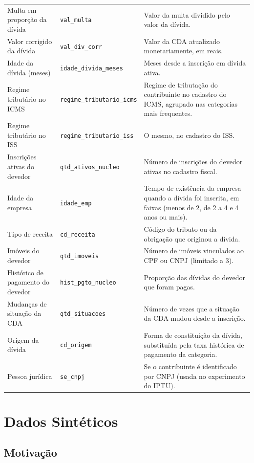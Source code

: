 {\begin{longtable}{>{\small\raggedright\arraybackslash}p{3.7cm}>{\small\raggedright\arraybackslash}p{4.4cm}>{\small\raggedright\arraybackslash}p{\dimexpr\textwidth-8.1cm-6\tabcolsep\relax}}
        Multa em proporção da dívida & \texttt{val\_multa} & Valor da multa dividido pelo valor da dívida. \\
        Valor corrigido da dívida & \texttt{val\_div\_corr} & Valor da CDA atualizado monetariamente, em reais. \\
        Idade da dívida (meses) & \texttt{idade\_divida\_meses} & Meses desde a inscrição em dívida ativa. \\
        Regime tributário no ICMS & \texttt{regime\_tributario\_icms} & Regime de tributação do contribuinte no cadastro do ICMS, agrupado nas categorias mais frequentes. \\
        Regime tributário no ISS & \texttt{regime\_tributario\_iss} & O mesmo, no cadastro do ISS. \\
        Inscrições ativas do devedor & \texttt{qtd\_ativos\_nucleo} & Número de inscrições do devedor ativas no cadastro fiscal. \\
        Idade da empresa & \texttt{idade\_emp} & Tempo de existência da empresa quando a dívida foi inscrita, em faixas (menos de 2, de 2 a 4 e 4 anos ou mais). \\
        Tipo de receita & \texttt{cd\_receita} & Código do tributo ou da obrigação que originou a dívida. \\
        Imóveis do devedor & \texttt{qtd\_imoveis} & Número de imóveis vinculados ao CPF ou CNPJ (limitado a 3). \\
        Histórico de pagamento do devedor & \texttt{hist\_pgto\_nucleo} & Proporção das dívidas do devedor que foram pagas. \\
        Mudanças de situação da CDA & \texttt{qtd\_situacoes} & Número de vezes que a situação da CDA mudou desde a inscrição. \\
        Origem da dívida & \texttt{cd\_origem} & Forma de constituição da dívida, substituída pela taxa histórica de pagamento da categoria. \\
        Pessoa jurídica & \texttt{se\_cnpj} & Se o contribuinte é identificado por CNPJ (usada no experimento do IPTU). \\
        
\end{longtable}
}

\section{Dados Sintéticos}
\label{sec:dados_sinteticos}

\subsection{Motivação}

